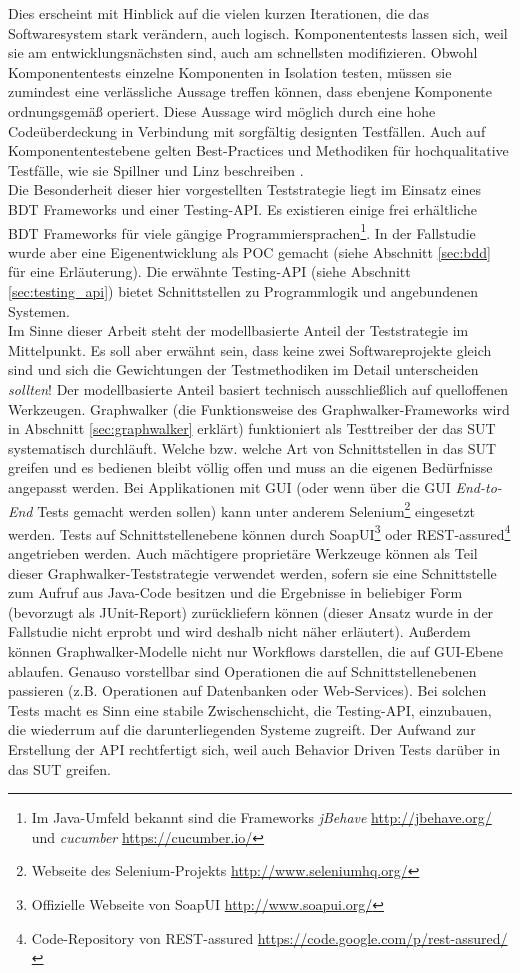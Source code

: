 Dies erscheint mit Hinblick auf die vielen kurzen Iterationen, die das Softwaresystem stark verändern, auch logisch. Komponententests lassen sich, weil sie am entwicklungsnächsten sind, auch am schnellsten modifizieren. Obwohl Komponententests einzelne Komponenten in Isolation testen, müssen sie zumindest eine verlässliche Aussage treffen können, dass ebenjene Komponente ordnungsgemäß operiert. Diese Aussage wird möglich durch eine hohe Codeüberdeckung in Verbindung mit sorgfältig designten Testfällen. Auch auf Komponententestebene gelten Best-Practices und Methodiken für hochqualitative Testfälle, wie sie Spillner und Linz beschreiben \cite{spillner_software_2014}.\\
Die Besonderheit dieser hier vorgestellten Teststrategie liegt im Einsatz eines \Gls{BDT} \cite{chelimsky_rspec_2010} Frameworks und einer Testing-API. Es existieren einige frei erhältliche \Gls{BDT} Frameworks für viele gängige Programmiersprachen\footnote{Im Java-Umfeld bekannt sind die Frameworks \textit{jBehave} \url{http://jbehave.org/} und \textit{cucumber} \url{https://cucumber.io/}}. In der Fallstudie wurde aber eine Eigenentwicklung als \Gls{POC} gemacht (siehe Abschnitt \ref{sec:bdd} für eine Erläuterung). Die erwähnte Testing-API (siehe Abschnitt \ref{sec:testing_api}) bietet Schnittstellen zu Programmlogik und angebundenen Systemen.\\
Im Sinne dieser Arbeit steht der modellbasierte Anteil der Teststrategie im Mittelpunkt. Es soll aber erwähnt sein, dass keine zwei Softwareprojekte gleich sind und sich die Gewichtungen der Testmethodiken im Detail unterscheiden \textit{sollten}! Der modellbasierte Anteil basiert technisch ausschließlich auf quelloffenen Werkzeugen. Graphwalker (die Funktionsweise des Graphwalker-Frameworks wird in Abschnitt \ref{sec:graphwalker} erklärt) funktioniert als Testtreiber der das \Gls{SUT} systematisch durchläuft. Welche bzw. welche Art von Schnittstellen in das \Gls{SUT} greifen und es bedienen bleibt völlig offen und muss an die eigenen Bedürfnisse angepasst werden. Bei Applikationen mit GUI (oder wenn über die GUI \textit{End-to-End} Tests gemacht werden sollen) kann unter anderem Selenium\footnote{Webseite des Selenium-Projekts \url{http://www.seleniumhq.org/}} eingesetzt werden. Tests auf Schnittstellenebene können durch SoapUI\footnote{Offizielle Webseite von SoapUI \url{http://www.soapui.org/}} oder REST-assured\footnote{Code-Repository von REST-assured \url{https://code.google.com/p/rest-assured/}} angetrieben werden. Auch mächtigere proprietäre Werkzeuge können als Teil dieser Graphwalker-Teststrategie verwendet werden, sofern sie eine Schnittstelle zum Aufruf aus Java-Code besitzen und die Ergebnisse in beliebiger Form (bevorzugt als JUnit-Report) zurückliefern können (dieser Ansatz wurde in der Fallstudie nicht erprobt und wird deshalb nicht näher erläutert). Außerdem können Graphwalker-Modelle nicht nur Workflows darstellen, die auf GUI-Ebene ablaufen. Genauso vorstellbar sind Operationen die auf Schnittstellenebenen passieren (z.B. Operationen auf Datenbanken oder Web-Services). Bei solchen Tests macht es Sinn eine stabile Zwischenschicht, die Testing-API, einzubauen, die wiederrum auf die darunterliegenden Systeme zugreift. Der Aufwand zur Erstellung der API rechtfertigt sich, weil auch Behavior Driven Tests darüber in das \Gls{SUT} greifen.
